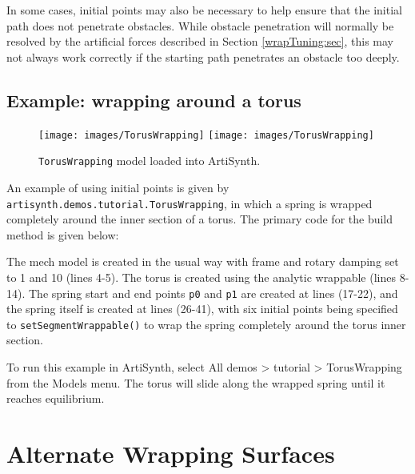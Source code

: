 \begin{sideblock}
In some cases, initial points may also be necessary to help ensure
that the initial path does not penetrate obstacles. While obstacle
penetration will normally be resolved by the artificial forces
described in Section \ref{wrapTuning:sec}, this may not always work
correctly if the starting path penetrates an obstacle too deeply.
\end{sideblock}

\subsection{Example: wrapping around a torus}
\label{TorusWrapping:sec}

\begin{figure}[ht]
\begin{center}
\iflatexml
 \texttt{[image: images/TorusWrapping]}
\else
 \texttt{[image: images/TorusWrapping]}
\fi
\end{center}
\caption{{\tt TorusWrapping} model loaded into ArtiSynth.}
\label{TorusWrapping:fig}
\end{figure}

An example of using initial points is given by {\tt
artisynth.demos.tutorial.TorusWrapping}, in which a spring
is wrapped completely around the inner section of a torus.
The primary code for
the build method is given below: 
\lstset{numbers=left}
\iflatexml

\else

\fi
\lstset{numbers=none}

The mech model is created in the usual way with frame and rotary
damping set to 1 and 10 (lines 4-5). The torus is created using the
analytic wrappable  (lines 8-14). The
spring start and end points {\tt p0} and {\tt p1} are created at lines
(17-22), and the spring itself is created at lines (26-41), with six
initial points being specified to {\tt setSegmentWrappable()} to wrap
the spring completely around the torus inner section.

To run this example in ArtiSynth, select {\sf All demos > tutorial >
TorusWrapping} from the {\sf Models} menu. The torus will slide along
the wrapped spring until it reaches equilibrium.

\section{Alternate Wrapping Surfaces}
\label{AlternateWrappingSurfaces:sec}

